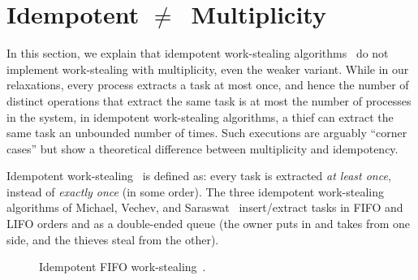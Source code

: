 \section{\label{sec-idem-neq-mult}Idempotent \texorpdfstring{\(\neq\)}\ \ Multiplicity}

In this section, we explain that idempotent work-stealing algorithms~\cite{maged.vechev.2009} do not implement work-stealing with multiplicity, even the weaker variant.  While in our relaxations, every process extracts a task at most once, and hence the number of distinct operations that extract the same task is at most the number of processes in the system, in idempotent work-stealing algorithms, a thief can extract the same task an unbounded number of times.  Such executions are arguably ``corner cases'' but show a theoretical difference between multiplicity and idempotency.

Idempotent work-stealing~\cite{maged.vechev.2009} is defined as: every task is extracted \emph{at least once}, instead of \emph{exactly once} (in some order).  The three idempotent work-stealing algorithms of Michael, Vechev, and Saraswat~\cite{maged.vechev.2009} insert/extract tasks in FIFO and LIFO orders and as a double-ended queue (the owner puts in and takes from one side, and the thieves steal from the other).

\begin{figure}
    \caption{\label{fig-idempotent-fifo}Idempotent FIFO work-stealing~\cite{maged.vechev.2009}.}
\end{figure}

